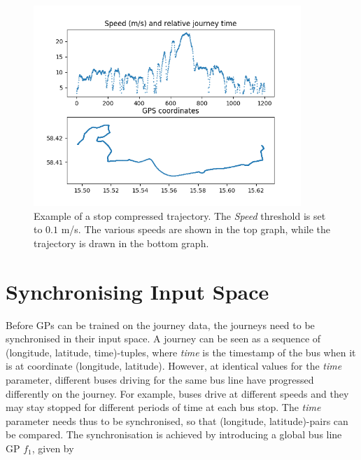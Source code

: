 \begin{figure}[h!]
    \centering
    \includegraphics[width=0.9\textwidth]{figures/time_and_speed}
    \caption[Example of a stop compressed trajectory]
    {\small Example of a stop compressed trajectory.
    The \textit{Speed} threshold is set to $0.1$ m/s.
    The various speeds are shown in the top graph, while the trajectory is drawn in the bottom graph.}
    \label{fig:time-and-speed}
\end{figure}

\section{Synchronising Input Space} \label{sec:synchronisation}
Before GPs can be trained on the journey data, the journeys need to be synchronised in their input space.
A journey can be seen as a sequence of (longitude, latitude, time)-tuples, where \textit{time} is the timestamp of the bus when it is at coordinate (longitude, latitude).
However, at identical values for the \textit{time} parameter, different buses driving for the same bus line have progressed differently on the journey.
For example, buses drive at different speeds and they may stay stopped for different periods of time at each bus stop.
The \textit{time} parameter needs thus to be synchronised, so that (longitude, latitude)-pairs can be compared.
The synchronisation is achieved by introducing a global bus line GP $f_1$, given by

